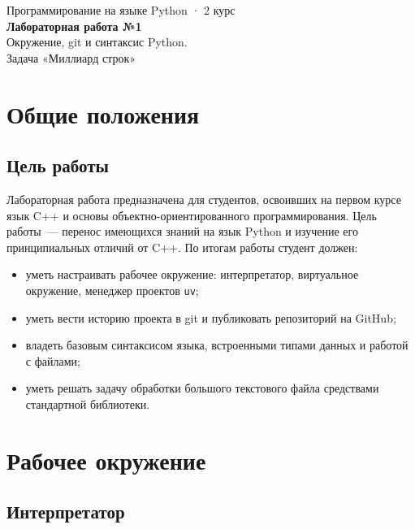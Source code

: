 \documentclass[11pt,a4paper]{article}
\newcommand{\code}[1]{\texttt{#1}}
\begin{document}
\begin{center}
  {\sffamily\small Программирование на языке Python · 2 курс}\\[0.6em]
  {\sffamily\LARGE\bfseries Лабораторная работа №1}\\[0.4em]
  {\sffamily\Large Окружение, git и синтаксис Python.\\ Задача «Миллиард строк»}
\end{center}

\tableofcontents
\newpage

\section{Общие положения}

\subsection{Цель работы}

Лабораторная работа предназначена для студентов, освоивших на первом курсе язык C++ и основы
объектно-ориентированного программирования. Цель работы~— перенос имеющихся знаний на язык
Python и изучение его принципиальных отличий от C++. По итогам работы студент должен:

\begin{itemize}
  \item уметь настраивать рабочее окружение: интерпретатор, виртуальное окружение, менеджер проектов \code{uv};
  \item уметь вести историю проекта в git и публиковать репозиторий на GitHub;
  \item владеть базовым синтаксисом языка, встроенными типами данных и работой с файлами;
  \item уметь решать задачу обработки большого текстового файла средствами стандартной библиотеки.
\end{itemize}

\section{Рабочее окружение}

\subsection{Интерпретатор}
\end{document}
